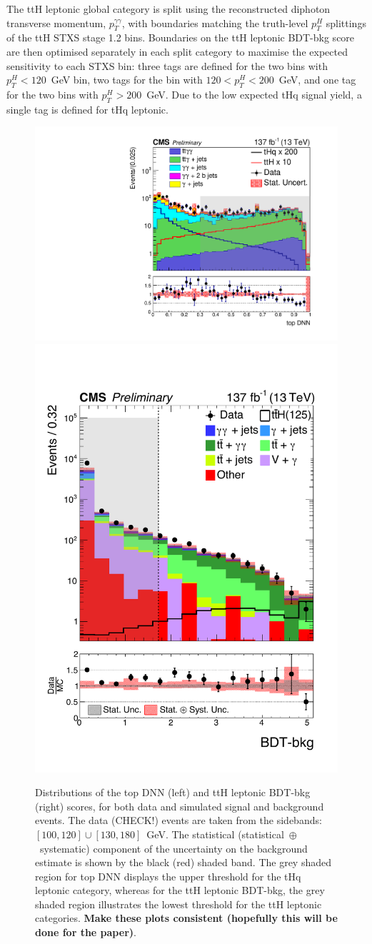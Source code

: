 The ttH leptonic global category is split using the reconstructed diphoton transverse momentum, $p_T^{\gamma\gamma}$, with boundaries matching the truth-level $p_T^H$ splittings of the ttH STXS stage 1.2 bins. Boundaries on the ttH leptonic BDT-bkg score are then optimised separately in each split category to maximise the expected sensitivity to each STXS bin: three tags are defined for the two bins with $p_T^H<120$~GeV bin, two tags for the bin with $120<p_T^H<200$~GeV, and one tag for the two bins with $p_T^H>200$~GeV. Due to the low expected tHq signal yield, a single tag is defined for tHq leptonic.

\begin{figure}[hptb]
  \centering
  \includegraphics[width=.49\textwidth]{Figures/hgg_overview/top_DNN.pdf}
  \hfill
  \includegraphics[width=.4\textwidth]{Figures/hgg_overview/ttH_leptonic_BDTbkg.pdf}
  \caption[Output scores of two discriminants used for the top-associated production mode categories]
  {
    Distributions of the top DNN (left) and ttH leptonic BDT-bkg (right) scores, for both data and simulated signal and background events. The data (CHECK!) events are taken from the \mgg sidebands: $[100,120]\cup[130,180]$~GeV. The statistical (statistical~$\oplus$~systematic) component of the uncertainty on the background estimate is shown by the black (red) shaded band. The grey shaded region for top DNN displays the upper threshold for the tHq leptonic category, whereas for the ttH leptonic BDT-bkg, the grey shaded region illustrates the lowest threshold for the ttH leptonic categories. \textbf{Make these plots consistent (hopefully this will be done for the paper)}.
  }
  \label{fig:categorisation_top}
\end{figure}

